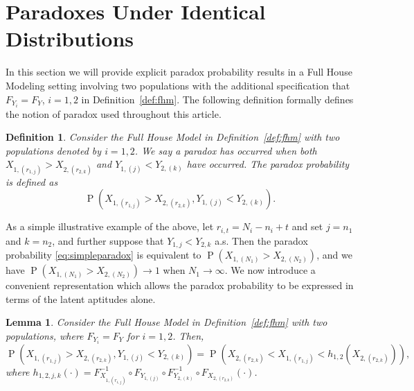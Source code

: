 \documentclass[12pt]{article}
\DeclareMathOperator*{\Prob}{P}
\newtheorem{lemma}[theorem]{Lemma}
\newtheorem{defn}[theorem]{Definition}
\begin{document}
\section*{Paradoxes Under Identical Distributions}
\label{sec:samedist}

In this section we will provide explicit paradox probability results in a Full House Modeling setting involving two populations with the additional specification that $F_{Y_i} = F_{Y}$, $i=1,2$ in Definition~\ref{def:fhm}. The following definition formally defines the notion of paradox used throughout this article.

\begin{defn}\label{def:paradox}
Consider the Full House Model in Definition~\ref{def:fhm} with two populations denoted by $i=1,2$. We say a paradox has occurred when both $X_{1,(r_{1,j})} > X_{2,(r_{2,k})}$ and  $Y_{1,(j)} < Y_{2,(k)}$ have occurred. The paradox probability is defined as
\begin{equation} \label{eq:simpleparadox}
  \Prob\left(X_{1,(r_{1,j})} > X_{2,(r_{2,k})}, Y_{1,(j)} < Y_{2,(k)}\right).
\end{equation}	
\end{defn}

As a simple illustrative example of the above, let $r_{i,t} = N_i - n_i + t$ and set $j = n_1$ and $k = n_2$, and further suppose that $Y_{1,j} < Y_{2,k}$ a.s. Then the paradox probability \eqref{eq:simpleparadox} is equivalent to $\Prob\left(X_{1,(N_1)} > X_{2,(N_2)}\right)$, and we have $\Prob\left(X_{1,(N_1)} > X_{2,(N_2)}\right) \to 1$ when $N_1 \to \infty$. We now introduce a convenient representation which allows the paradox probability to be expressed in terms of the latent aptitudes alone.


\begin{lemma} \label{lemma:rep}
Consider the Full House Model in Definition~\ref{def:fhm} with two populations, where $F_{Y_i} = F_{Y}$ for $i=1,2$. Then, 
\begin{equation} \label{eq:pararep}
  \Prob\left(X_{1,(r_{1,j})} > X_{2,(r_{2,k})}, Y_{1,(j)} < Y_{2,(k)}\right) 
  = \Prob\left( X_{2,(r_{2,k})} < X_{1,(r_{1,j})}  < h_{1,2}\left(X_{2,(r_{2,k})}\right)\right),
\end{equation}
where $h_{1,2,j,k}(\cdot) = F_{X_{1,(r_{1,j})}}^{-1} \circ F_{Y_{1, (j)}} \circ F_{Y_{2, (k)}}^{-1} \circ F_{X_{2,(r_{2,k})}} (\cdot)$.
\end{lemma}
\end{document}
